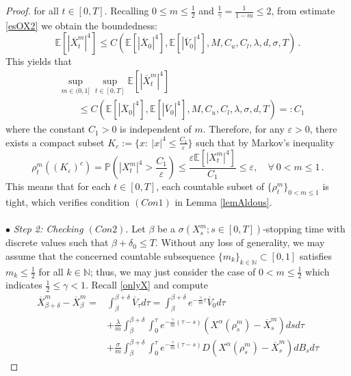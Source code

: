 \documentclass{ims9x6}
\newcommand{\EE}{\mathbb{E}}
\newcommand{\NN}{\mathbb{N}}
\newcommand{\PP}{\mathbb{P}}
\newcommand{\OV}{\overline{V}}
\newcommand{\OX}{\overline{X}}
\begin{document}
\begin{proof}
for all $t\in[0,T]$.
	Recalling  $0\leq m\leq \frac{1}{2}$ and $\frac{1}{\gamma}=\frac{1}{1-m}\leq 2$, from estimate \eqref{esOX2} we obtain the boundedness:
	\begin{equation}\label{Sm}
	\EE[|\OX_t^m|^4] \leq C(\EE[|\OX_0|^4],\EE[|\OV_0|^4],M,C_u,C_l,\lambda,d,\sigma,T)\,.
	\end{equation}
	This yields that
	\begin{equation} \label{uniform-bd}
	\begin{split}
	&\sup_{m\in(0,1]} \sup_{t\in[0,T]}\EE[|\OX_t^m|^4] \\
	&\qquad \leq C(\EE[|\OX_0|^4],\EE[|\OV_0|^4],M,C_u,C_l,\lambda,\sigma,d,T)=:C_1
	\end{split}
	\end{equation}
	where the constant $C_1>0$ is independent of $m$. Therefore, for any $\varepsilon>0$, there exists a compact subset $K_\varepsilon:=\{x:~|x|^4\leq \frac{C_1}{\varepsilon}\}$ such that by Markov's inequality
	\begin{equation}
	\rho_t^m((K_\varepsilon)^c)=\PP(|X_t^m|^4> \frac{C_1}{\varepsilon})\leq \frac{\varepsilon\EE[|X_t^m|^4]}{C_1}\leq\varepsilon,\quad \forall ~0<m\leq 1\,.
	\end{equation}
	This means that for each $t\in[0,T]$, each countable subset of $\{\rho_t^m\}_{0<m\leq 1}$ is tight, which verifies  condition $(Con 1)$ in Lemma \ref{lemAldous}.
	\\ \\
	$\bullet$ \textit{Step 2: Checking $(Con 2)$. }   Let $\beta$ be a $\sigma(X^m_s;s\in[0,T])$-stopping time with discrete values such that $\beta+\delta_0\leq T$. Without any loss of generality, we may assume that the concerned countable subsequence $\{m_k\}_{k\in\mathbb N} \subset [0,1]$ satisfies $m_k\leq \frac{1}{2}$ for all $k\in\NN$; thus, we may just consider the case of $0<m\leq \frac{1}{2}$ which indicates $\frac{1}{2}\leq \gamma<1$. 
	Recall \eqref{onlyX} and compute
	\begin{equation*}
		\begin{split}
		\OX_{\beta+\delta}^m-\OX_{\beta}^m =&\int_\beta^{\beta+\delta}\OV_\tau d\tau = \int_\beta^{\beta+\delta}  e^{-\frac{\gamma}{m}\tau}\OV_0d\tau \\
		&+\frac{\lambda}{m}\int_\beta^{\beta+\delta}\int_0^\tau e^{-\frac{\gamma}{m}(\tau-s)}(X^{\alpha}(\rho_s^m)-\OX_s^m)dsd\tau
		\\
		&  +\frac{\sigma}{m}\int_\beta^{\beta+\delta}\int_0^\tau e^{-\frac{\gamma}{m}(\tau-s)}D(X^{\alpha}(\rho_s^m)-\OX_s^m)dB_s d\tau 		\end{split}

\end{equation*}
\end{proof}
\end{document}
